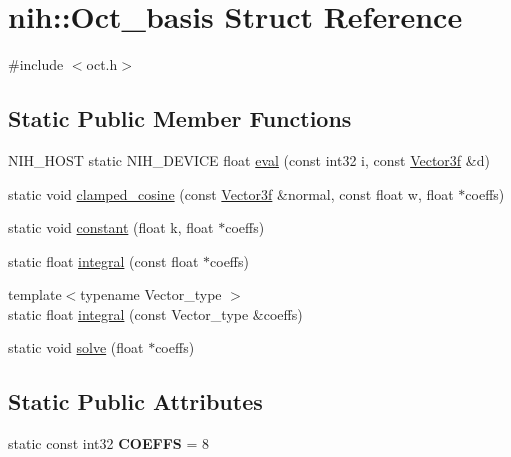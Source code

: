 \hypertarget{structnih_1_1_oct__basis}{
\section{nih\-:\-:\-Oct\-\_\-basis \-Struct \-Reference}
\label{structnih_1_1_oct__basis}
}


{\ttfamily \#include $<$oct.\-h$>$}

\subsection*{\-Static \-Public \-Member \-Functions}
\begin{DoxyCompactItemize}
\item 
\-N\-I\-H\-\_\-\-H\-O\-S\-T static \-N\-I\-H\-\_\-\-D\-E\-V\-I\-C\-E float \hyperlink{structnih_1_1_oct__basis_a3416fb501ffa0800555a1d6d155d1ede}{eval} (const int32 i, const \hyperlink{structnih_1_1_vector}{\-Vector3f} \&d)
\item 
static void \hyperlink{structnih_1_1_oct__basis_acb3b29cb0c7c734967155a0db1f4cc21}{clamped\-\_\-cosine} (const \hyperlink{structnih_1_1_vector}{\-Vector3f} \&normal, const float w, float $\ast$coeffs)
\item 
static void \hyperlink{structnih_1_1_oct__basis_a65fc8be223ac745b96f1fe8fc6d7b17c}{constant} (float k, float $\ast$coeffs)
\item 
static float \hyperlink{structnih_1_1_oct__basis_a24c4318d1fff8c5479cb9818d091a762}{integral} (const float $\ast$coeffs)
\item 
{\footnotesize template$<$typename Vector\-\_\-type $>$ }\\static float \hyperlink{structnih_1_1_oct__basis_acb720797ed36adc43ee4c40d8189ade6}{integral} (const \-Vector\-\_\-type \&coeffs)
\item 
static void \hyperlink{structnih_1_1_oct__basis_a0278f1597434a516d596659ec9501d89}{solve} (float $\ast$coeffs)
\end{DoxyCompactItemize}
\subsection*{\-Static \-Public \-Attributes}
\begin{DoxyCompactItemize}
\item 
\hypertarget{structnih_1_1_oct__basis_a9cb8fb88334e2a673b32ab0d7e00d97c}{
static const int32 {\bfseries \-C\-O\-E\-F\-F\-S} = 8}
\label{structnih_1_1_oct__basis_a9cb8fb88334e2a673b32ab0d7e00d97c}

\end{DoxyCompactItemize}


